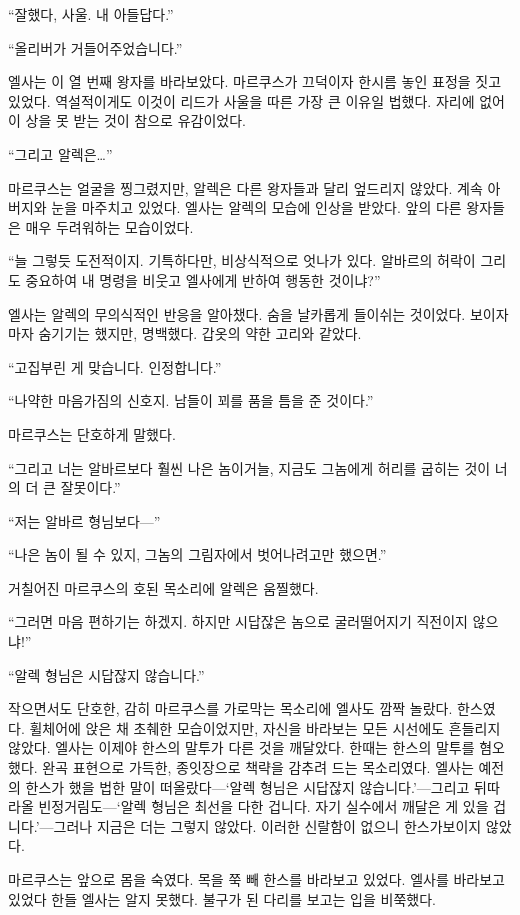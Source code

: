 ``잘했다, 사울. 내 아들답다.''

``올리버가 거들어주었습니다.''

엘사는 이 열 번째 왕자를 바라보았다. 마르쿠스가 끄덕이자 한시름 놓인 표정을 짓고 있었다. 역설적이게도 이것이 리드가 사울을 따른 가장 큰 이유일 법했다. 자리에 없어 이 상을 못 받는 것이 참으로 유감이었다.

``그리고 알렉은\ldots''

마르쿠스는 얼굴을 찡그렸지만, 알렉은 다른 왕자들과 달리 엎드리지 않았다. 계속 아버지와 눈을 마주치고 있었다. 엘사는 알렉의 모습에 인상을 받았다. 앞의 다른 왕자들은 매우 두려워하는 모습이었다.

``늘 그렇듯 도전적이지. 기특하다만, 비상식적으로 엇나가 있다. 알바르의 허락이 그리도 중요하여 내 명령을 비웃고 엘사에게 반하여 행동한 것이냐?''

엘사는 알렉의 무의식적인 반응을 알아챘다. 숨을 날카롭게 들이쉬는 것이었다. 보이자마자 숨기기는 했지만, 명백했다. 갑옷의 약한 고리와 같았다.

`` 고집부린 게 맞습니다. 인정합니다.''

``나약한 마음가짐의 신호지. 남들이 꾀를 품을 틈을 준 것이다.''

마르쿠스는 단호하게 말했다.

``그리고 너는 알바르보다 훨씬 나은 놈이거늘, 지금도 그놈에게 허리를 굽히는 것이 너의 더 큰 잘못이다.''

``저는 알바르 형님보다—''

``나은 놈이 될 수 있지, 그놈의 그림자에서 벗어나려고만 했으면.''

거칠어진 마르쿠스의 호된 목소리에 알렉은 움찔했다.

``그러면 마음 편하기는 하겠지. 하지만 시답잖은 놈으로 굴러떨어지기 직전이지 않으냐!''

``알렉 형님은 시답잖지 않습니다.''

작으면서도 단호한, 감히 마르쿠스를 가로막는 목소리에 엘사도 깜짝 놀랐다. 한스였다. 휠체어에 앉은 채 초췌한 모습이었지만, 자신을 바라보는 모든 시선에도 흔들리지 않았다. 엘사는 이제야 한스의 말투가 다른 것을 깨달았다. 한때는 한스의 말투를 혐오했다. 완곡 표현으로 가득한, 종잇장으로 책략을 감추려 드는 목소리였다. 엘사는 예전의 한스가 했을 법한 말이 떠올랐다—`알렉 형님은 시답잖지 않습니다.'—그리고 뒤따라올 빈정거림도—`알렉 형님은 최선을 다한 겁니다. 자기 실수에서 깨달은 게 있을 겁니다.'—그러나 지금은 더는 그렇지 않았다. 이러한 신랄함이 없으니 한스가 보이지 않았다.

마르쿠스는 앞으로 몸을 숙였다. 목을 쭉 빼 한스를 바라보고 있었다. 엘사를 바라보고 있었다 한들 엘사는 알지 못했다. 불구가 된 다리를 보고는 입을 비쭉했다.

